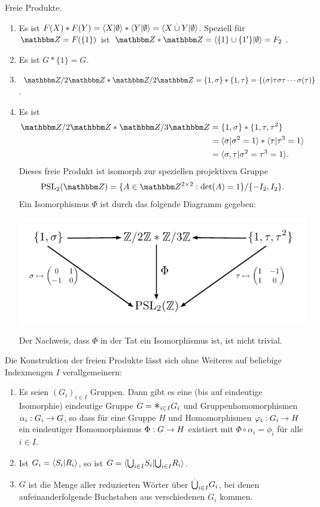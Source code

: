 \documentclass[a4paper, 12pt, twoside]{article}
\begin{document}
\BSP Freie Produkte.
\begin{enumerate}
\item Es ist $F(X)*F(Y) = \langle X|\emptyset\rangle*\langle Y|\emptyset\rangle
=\langle X\overset{.}{\cup} Y|\emptyset\rangle$.
Speziell für $\ZZ=F(\{1\})$ ist
$\ZZ*\ZZ=\lag \{1\}\cup\{1'\}|\emptyset\rag=F_2$.
\item Es ist $G*\{1\}=G$.
\item $\ZZ/2\ZZ*\ZZ/2\ZZ=\{1,\sigma\}*\{1,\tau\}
=\{(\sigma)\tau\sigma\tau\cdots\sigma(\tau)\}$.
\item Es ist
\begin{align*}
\ZZ/2\ZZ * \ZZ/3\ZZ &= \{1,\sigma\}*\{1,\tau,\tau^2\} \\
&=\lag\sigma|\sigma^2=1\rag*\lag\tau|\tau^3=1\rag\\
&=\lag\sigma,\tau|\sigma^2=\tau^3=1\rag.
\end{align*}
Dieses freie Produkt ist isomorph zur speziellen projektiven Gruppe
\[
\PSL_2(\ZZ)
=\{
A\in \ZZ^{2\times 2} : \det(A)=1
\}/\{-I_2, I_2\}.
\]
Ein Isomorphismus $\Phi$ ist durch das folgende Diagramm gegeben:
\begin{center}
	\includegraphics{grugraImages/PSL}
\end{center}
Der Nachweis, dass $\Phi$ in der Tat ein Isomorphismus ist, ist nicht
trivial.
\end{enumerate}

\BEM Die Konstruktion der freien Produkte lässt sich
ohne Weiteres auf beliebige Indexmengen $I$ verallgemeinern:
\begin{enumerate}
\item Es seien $(G_i)_{i\in I}$ Gruppen. Dann gibt es eine (bis auf eindeutige
Isomorphie) eindeutige Gruppe $G=\text{\Large$*$}_{i\in I} G_i$ und
Gruppenhomomorphismen $\alpha_i:G_i\rightarrow G$, so dass
für eine Gruppe $H$ und Homomorphismen $\varphi_i:G_i\rightarrow H$
ein eindeutiger Homomorphismus $\Phi:G\rightarrow H$ existiert mit
$\Phi\circ\alpha_i=\phi_i$ für alle $i\in I$.
\item Ist $G_i=\langle S_i|R_i\rangle$, so ist
$G=\langle \overset{.}{\bigcup}_{i\in I}S_i|\overset{.}{\bigcup}_{i\in I}R_i \rangle$.
\item $G$ ist die Menge aller reduzierten Wörter über
$\overset{.}{\bigcup}_{i\in I} G_i$, bei denen aufeinanderfolgende
Buchstaben aus verschiedenen $G_i$ kommen.
\end{enumerate}
\end{document}
